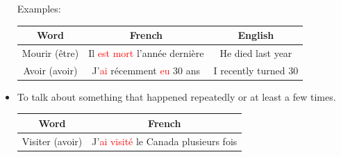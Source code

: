 \documentclass{book}
\begin{document}
\begin{itemize}
\begin{center}
\begin{tabular}{|c|c|}
            \hline
        \end{tabular}
    \end{center}
    Examples:
    \begin{center}
        \begin{tabular}{|c|c|c|}
            \hline
            \textbf{Word} & \textbf{French} & \textbf{English} \\
            \hline
            Mourir (être) & Il \textcolor{red}{est mort} l'année dernière & He died last year \\
            \hline
            Avoir (avoir) & J'\textcolor{red}{ai} récemment \textcolor{red}{eu} 30 ans & I recently turned 30 \\
            \hline
        \end{tabular}
    \end{center}

    \item To talk about something that happened repeatedly or at least a few times.
    \begin{center}
        \begin{tabular}{|c|c|}
            \hline
            \textbf{Word} & \textbf{French} \\
            \hline
            Visiter (avoir) & J'\textcolor{red}{ai visité} le Canada plusieurs fois \\
            \hline
        \end{tabular}
    \end{center}


\end{itemize}
\end{document}
